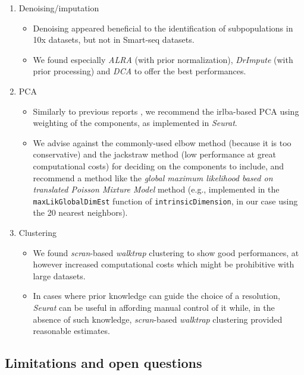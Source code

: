 \documentclass{bmcart}
\begin{document}
\begin{enumerate}
\begin{itemize}
   \end{itemize}
   \item Denoising/imputation
   \begin{itemize}
       \item Denoising appeared beneficial to the identification of subpopulations in 10x datasets, but not in Smart-seq datasets.
       \item We found especially \textit{ALRA} (with prior normalization), \textit{DrImpute} (with prior processing) and \textit{DCA} to offer the best performances.
   \end{itemize}
   \item PCA
   \begin{itemize}
     \item Similarly to previous reports \cite{SunDimRed2019}, we recommend the irlba-based PCA using weighting of the components, as implemented in \textit{Seurat}. 
     \item We advise against the commonly-used elbow method (because it is too conservative) and the jackstraw method (low performance at great computational costs) for deciding on the components to include, and recommend a method like the \textit{global maximum likelihood based on translated Poisson Mixture Model} method (e.g., implemented in the  \texttt{maxLikGlobalDimEst} function of \texttt{intrinsicDimension}, in our case using the 20 nearest neighbors).
   \end{itemize}
   \item Clustering
   \begin{itemize}
    \item We found \textit{scran}-based \textit{walktrap} clustering to show good performances, at however increased computational costs which might be prohibitive with large datasets.
    \item In cases where prior knowledge can guide the choice of a resolution, \textit{Seurat} can be useful in affording manual control of it while, in the absence of such knowledge, \textit{scran}-based \textit{walktrap} clustering provided reasonable estimates.
   \end{itemize}
\end{enumerate}

\subsection*{Limitations and open questions}
\end{document}
